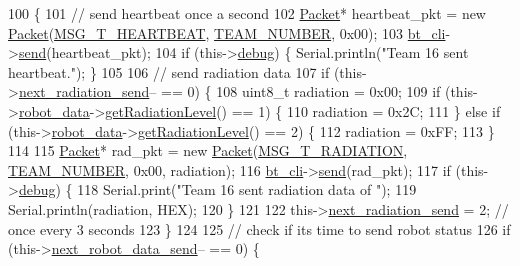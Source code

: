 \begin{DoxyCode}
100                               \{
101     \textcolor{comment}{// send heartbeat once a second}
102     \hyperlink{class_packet}{Packet}* heartbeat\_pkt = \textcolor{keyword}{new} \hyperlink{class_packet}{Packet}(\hyperlink{config_8h_af9f709a26a3135b1826aca9a0b85295b}{MSG\_T\_HEARTBEAT}, 
      \hyperlink{config_8h_a9dd3063be5a2b2a9e053e58f7688b0db}{TEAM\_NUMBER}, 0x00);
103     \hyperlink{class_messenger_a481ed6f0554ddfb8441b7dc073f57ebd}{bt\_cli}->\hyperlink{class_bluetooth_client_a0f0d9b99f80c2eab9d9d33d8aca91bf6}{send}(heartbeat\_pkt);
104     \textcolor{keywordflow}{if} (this->\hyperlink{class_messenger_a103d1964b9540a6b6b1c4ea7d79f3af3}{debug}) \{ Serial.println(\textcolor{stringliteral}{"Team 16 sent heartbeat."}); \}
105 
106     \textcolor{comment}{// send radiation data}
107     \textcolor{keywordflow}{if} (this->\hyperlink{class_messenger_a4da89e69daa6684d63fa02ff64886fe6}{next\_radiation\_send}-- == 0) \{
108         uint8\_t radiation = 0x00;
109         \textcolor{keywordflow}{if} (this->\hyperlink{class_messenger_aaeacb9e9c4aad3b1be628df9ec71c11c}{robot\_data}->\hyperlink{class_robot_data_a8bffbd345dfd74acedd44270133e0477}{getRadiationLevel}() == 1) \{
110             radiation = 0x2C;
111         \} \textcolor{keywordflow}{else} \textcolor{keywordflow}{if} (this->\hyperlink{class_messenger_aaeacb9e9c4aad3b1be628df9ec71c11c}{robot\_data}->\hyperlink{class_robot_data_a8bffbd345dfd74acedd44270133e0477}{getRadiationLevel}() == 2) \{
112             radiation = 0xFF;
113         \}
114 
115         \hyperlink{class_packet}{Packet}* rad\_pkt = \textcolor{keyword}{new} \hyperlink{class_packet}{Packet}(\hyperlink{config_8h_a1f7b9956933864df7a2f3127cf084bdb}{MSG\_T\_RADIATION}, 
      \hyperlink{config_8h_a9dd3063be5a2b2a9e053e58f7688b0db}{TEAM\_NUMBER}, 0x00, radiation);
116         \hyperlink{class_messenger_a481ed6f0554ddfb8441b7dc073f57ebd}{bt\_cli}->\hyperlink{class_bluetooth_client_a0f0d9b99f80c2eab9d9d33d8aca91bf6}{send}(rad\_pkt);
117         \textcolor{keywordflow}{if} (this->\hyperlink{class_messenger_a103d1964b9540a6b6b1c4ea7d79f3af3}{debug}) \{
118             Serial.print(\textcolor{stringliteral}{"Team 16 sent radiation data of "});
119             Serial.println(radiation, HEX);
120         \}
121 
122         this->\hyperlink{class_messenger_a4da89e69daa6684d63fa02ff64886fe6}{next\_radiation\_send} = 2; \textcolor{comment}{// once every 3 seconds}
123     \}
124 
125     \textcolor{comment}{// check if its time to send robot status}
126     \textcolor{keywordflow}{if} (this->\hyperlink{class_messenger_af47b5f9743fcef4fdb73801ae7c6b023}{next\_robot\_data\_send}-- == 0) \{

\end{DoxyCode}
